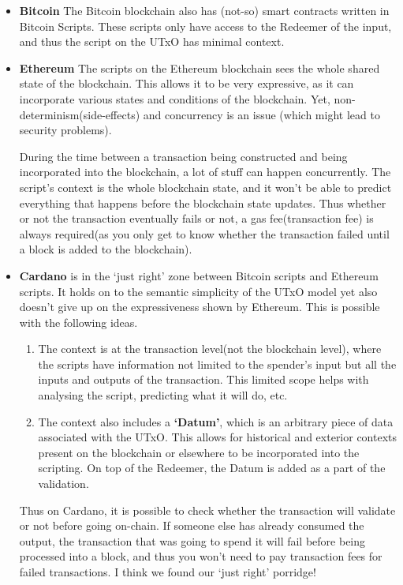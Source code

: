 \documentclass[a4paper, 11pt]{article}
\begin{document}
    \begin{itemize}
        \item \textbf{Bitcoin} The Bitcoin blockchain also has (not-so) smart contracts written in Bitcoin Scripts. These scripts only have access to the Redeemer of the input, and thus the script on the UTxO has minimal context.
         
        \item \textbf{Ethereum} The scripts on the Ethereum blockchain sees the whole shared state of the blockchain. This allows it to be very expressive, as it can incorporate various states and conditions of the blockchain. Yet, non-determinism(side-effects) and concurrency is an issue (which might lead to security problems).
        
        During the time between a transaction being constructed and being incorporated into the blockchain, a lot of stuff can happen concurrently. The script's context is the whole blockchain state, and it won't be able to predict everything that happens before the blockchain state updates. Thus whether or not the transaction eventually fails or not, a gas fee(transaction fee) is always required(as you only get to know whether the transaction failed until a block is added to the blockchain). 

        \item \textbf{Cardano} is in the `just right' zone between Bitcoin scripts and Ethereum scripts. It holds on to the semantic simplicity of the UTxO model yet also doesn't give up on the expressiveness shown by Ethereum. This is possible with the following ideas. 
        \begin{enumerate}
            \item The context is at the transaction level(not the blockchain level), where the scripts have information not limited to the spender's input but all the inputs and outputs of the transaction. This limited scope helps with analysing the script, predicting what it will do, etc.
            \item The context also includes a \textbf{`Datum'}, which is an arbitrary piece of data associated with the UTxO. This allows for historical and exterior contexts present on the blockchain or elsewhere to be incorporated into the scripting. On top of the Redeemer, the Datum is added as a part of the validation.
        \end{enumerate} 

        Thus on Cardano, it is possible to check whether the transaction will validate or not before going on-chain. If someone else has already consumed the output, the transaction that was going to spend it will fail before being processed into a block, and thus you won't need to pay transaction fees for failed transactions. I think we found our `just right' porridge!
    \end{itemize}
\end{document}
